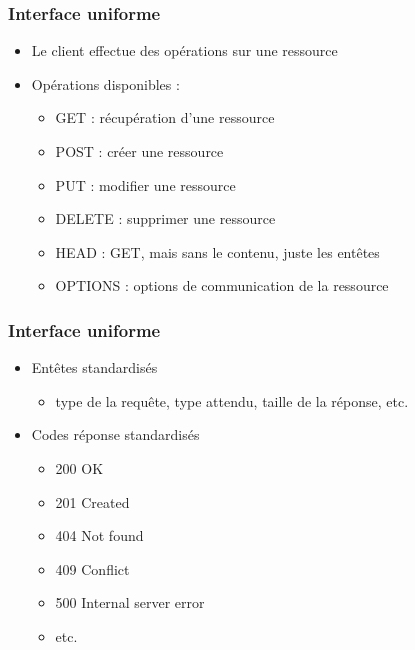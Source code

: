 \begin{frame}
 \frametitle{Interface uniforme}
 
 \begin{itemize}
  \item Le client effectue des opérations sur une ressource
  \item Opérations disponibles :
  \begin{itemize}
   \item GET : récupération d'une ressource
   \item POST : créer une ressource
   \item PUT : modifier une ressource
   \item DELETE : supprimer une ressource
   \item HEAD : GET, mais sans le contenu, juste les entêtes
   \item OPTIONS : options de communication de la ressource
  \end{itemize}
 \end{itemize} 

\end{frame}

\begin{frame}
 \frametitle{Interface uniforme}
 
 \begin{itemize}
  \item Entêtes standardisés
  \begin{itemize}
   \item type de la requête, type attendu, taille de la réponse, etc.
  \end{itemize}
  \item Codes réponse standardisés
  \begin{itemize}
   \item 200 OK
   \item 201 Created
   \item 404 Not found
   \item 409 Conflict
   \item 500 Internal server error
   \item etc.
  \end{itemize}
 \end{itemize} 

\end{frame}

